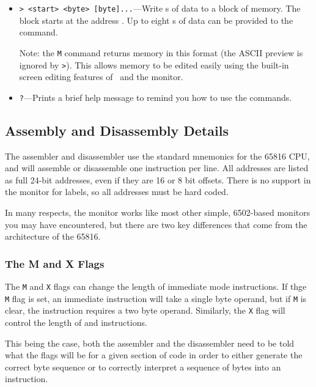 \documentclass{report}
\begin{document}
\begin{itemize}
        \item \verb+> <start> <byte> [byte]...+---Write s of data to a block of memory.
            The block starts at the address .
            Up to eight s of data can be provided to the command.

            {\sc Note:} the \verb+M+ command returns memory in this format (the ASCII preview is
            ignored by \verb+>+). This allows memory to be edited easily using the built-in
            screen editing features of \BASIC\ and the monitor.

        \item \verb+?+---Prints a brief help message to remind you how to use the commands.
    \end{itemize}

    \subsection*{Assembly and Disassembly Details}

    The assembler and disassembler use the standard mnemonics for the 65816 CPU, and will
    assemble or disassemble one instruction per line.
    All addresses are listed as full 24-bit addresses, even if they are 16 or 8 bit offsets.
    There is no support in the monitor for labels, so all addresses must be hard coded.

    In many respects, the monitor works like most other simple, 6502-based monitors you may
    have encountered, but there are two key differences that come from the architecture of the
    65816.

    \subsubsection*{The M and X Flags}

    The \verb+M+ and \verb+X+ flags can change the length of immediate mode instructions.
    If thge \verb+M+ flag is set, an immediate  instruction will take a single
    byte operand, but if \verb+M+ is clear, the instruction requires a two byte operand.
    Similarly, the \verb+X+ flag will control the length of  and 
    instructions.

    This being the case, both the assembler and the disassembler need to be told what the 
    flags will be for a given section of code in order to either generate the correct byte
    sequence or to correctly interpret a sequence of bytes into an instruction.
\end{document}
